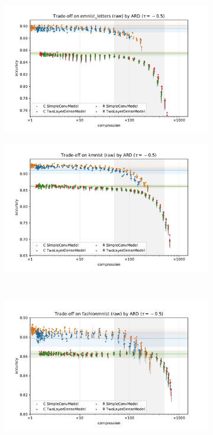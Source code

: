 \documentclass[a4paper,10pt]{article}
\begin{document}
\begin{figure}[b]
  \centering
  \begin{subfigure}[b]{0.5\textwidth}
    \centering
    \includegraphics[width=\linewidth]{figure__mnist-like__trade-off/appendix__ARD__emnist_letters__raw__-0.5.pdf}
  \end{subfigure}%
  \begin{subfigure}[b]{0.5\textwidth}
    \centering
    \includegraphics[width=\linewidth]{figure__mnist-like__trade-off/appendix__ARD__kmnist__raw__-0.5.pdf}
  \end{subfigure} \\%
  \begin{subfigure}[b]{0.5\textwidth}
    \centering
    \includegraphics[width=\linewidth]{figure__mnist-like__trade-off/appendix__ARD__fashionmnist__raw__-0.5.pdf}

\end{subfigure}
\end{figure}
\end{document}
